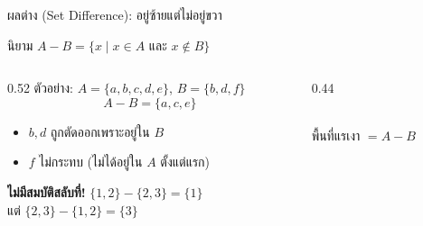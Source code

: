 \begin{frame}{ผลต่าง (Set Difference): อยู่ซ้ายแต่ไม่อยู่ขวา}
  \begin{block}{นิยาม}
    $A - B = \{x \mid x \in A \text{ และ } x \notin B\}$
  \end{block}
  \begin{columns}[T]
    \begin{column}{0.52\textwidth}
      ตัวอย่าง: $A = \{a,b,c,d,e\}$, $B = \{b,d,f\}$
      \[ A - B = \{a, c, e\} \]
      \begin{itemize}\small
        \item $b, d$ ถูกตัดออกเพราะอยู่ใน $B$
        \item $f$ ไม่กระทบ (ไม่ได้อยู่ใน $A$ ตั้งแต่แรก)
      \end{itemize}
      \begin{alertblock}{}\small
        \textbf{ไม่มีสมบัติสลับที่!} \quad $\{1,2\} - \{2,3\} = \{1\}$ \\
        แต่ $\{2,3\} - \{1,2\} = \{3\}$
      \end{alertblock}
    \end{column}
    \begin{column}{0.44\textwidth}
      \begin{center}
      \\
      พื้นที่แรเงา $= A - B$
      \end{center}
    \end{column}
  \end{columns}
\end{frame}

